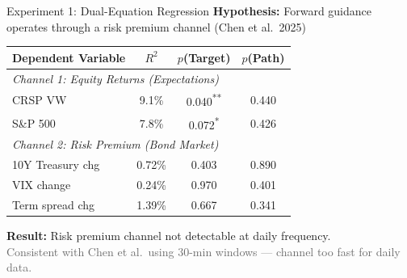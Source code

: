 \documentclass[aspectratio=169, 11pt]{beamer}
\begin{document}
\begin{frame}{Experiment 1: Dual-Equation Regression}
\textbf{Hypothesis:} Forward guidance operates through a risk premium channel (Chen et al.\ 2025)

\vspace{0.5em}
\begin{tabular}{lccc}
\toprule
Dependent Variable & $R^2$ & $p$(Target) & $p$(Path) \\
\midrule
\multicolumn{4}{l}{\textit{Channel 1: Equity Returns (Expectations)}} \\
\quad CRSP VW & 9.1\% & 0.040\textsuperscript{**} & 0.440 \\
\quad S\&P 500 & 7.8\% & 0.072\textsuperscript{*} & 0.426 \\
\midrule
\multicolumn{4}{l}{\textit{Channel 2: Risk Premium (Bond Market)}} \\
\quad 10Y Treasury chg & 0.72\% & 0.403 & 0.890 \\
\quad VIX change & 0.24\% & 0.970 & 0.401 \\
\quad Term spread chg & 1.39\% & 0.667 & 0.341 \\
\bottomrule
\end{tabular}

\vspace{0.5em}
\textbf{Result:} Risk premium channel \alert{not detectable} at daily frequency.\\
\textcolor{dimgray}{\small Consistent with Chen et al.\ using 30-min windows --- channel too fast for daily data.}
\end{frame}
\end{document}
